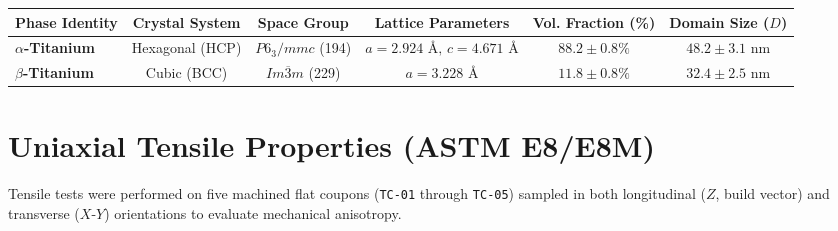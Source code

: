 \documentclass[10pt,a4paper,parskip=half]{scrartcl}
\begin{document}
\vspace{1mm}
\noindent
{}
\vspace{-1mm}
{\small
\begin{tabularx}{\textwidth}{@{}lCCCCC@{}}
\toprule
{}
\textbf{Phase Identity} & \textbf{Crystal System} & \textbf{Space Group} & \textbf{Lattice Parameters} & \textbf{Vol. Fraction (\%)} & \textbf{Domain Size ($D$)} \\
\midrule
\textbf{$\alpha$-Titanium} & Hexagonal (HCP) & $P6_3/mmc$ (194) & $a=2.924\text{ \AA},\, c=4.671\text{ \AA}$ & $88.2 \pm 0.8\%$ & $48.2 \pm 3.1\text{ nm}$ \\
\textbf{$\beta$-Titanium} & Cubic (BCC) & $Im\overline{3}m$ (229) & $a=3.228\text{ \AA}$ & $11.8 \pm 0.8\%$ & $32.4 \pm 2.5\text{ nm}$ \\
\bottomrule
\end{tabularx}
}

\vspace{2mm}

\section{Uniaxial Tensile Properties (ASTM E8/E8M)}

Tensile tests were performed on five machined flat coupons (\texttt{TC-01} through \texttt{TC-05}) sampled in both longitudinal ($Z$, build vector) and transverse ($X$-$Y$) orientations to evaluate mechanical anisotropy.
\end{document}

